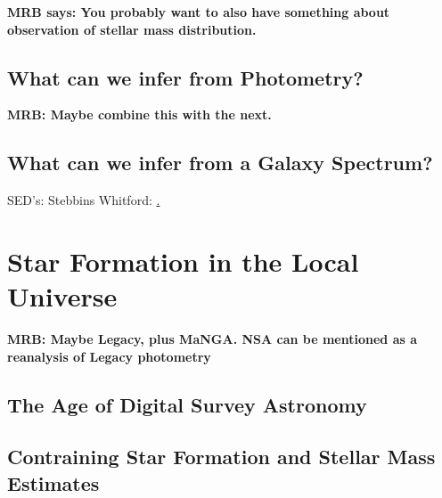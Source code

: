 {\bf MRB says: You probably want to also have something
about observation of stellar mass distribution.}

\subsection{What can we infer from Photometry?}

{\bf MRB: Maybe combine this with the next.}

\subsection{What can we infer from a Galaxy Spectrum?}

SED's: Stebbins Whitford: \href{http://adsabs.harvard.edu/abs/1968ApJ...154...21O}.

\section{Star Formation in the Local Universe}

{\bf MRB: Maybe Legacy, plus MaNGA. NSA can be mentioned
as a reanalysis of Legacy photometry}

\subsection{The Age of Digital Survey Astronomy}

\subsection{Contraining Star Formation and Stellar Mass Estimates}



